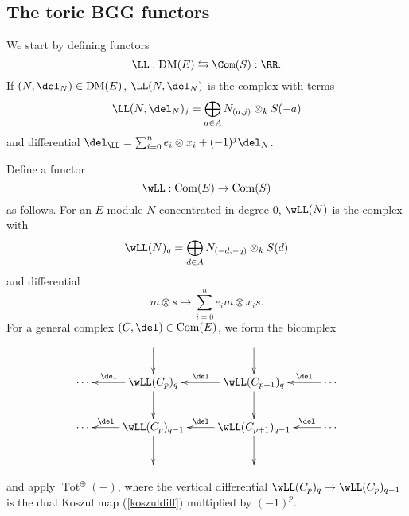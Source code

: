 \documentclass[12pt]{amsart}
\theoremstyle{definition}
\theoremstyle{remark}
\newcommand{\ZZ}{\mathbb Z}
\newcommand{\daniel}[1]{{\color{blue} \sf $\clubsuit\clubsuit\clubsuit$ Daniel: [#1]}}
\def\on{\operatorname}
\def\DM{\operatorname{DM}}
\begin{document}
\subsection{The toric BGG functors}
\iffalse
In the BGG correspondence for the standard $\ZZ$-graded polynomial ring, there are adjoint functors $\RR$ and $\LL$, which give equivalences of categories between $D(S)$ and $D(E)$.  

Famously, under the functor $\RR$,  the standard $\ZZ$-grading of the $S$-modules becomes the homological grading on $D(E)$ side, and the homological grading on $D(S)$ becomes the $\ZZ$-grading of the $E$-modules.  (A similar statement holds for $\LL$.)

Things are more subtle if $S$ has a nonstandard grading, though a similar exchange still holds.  In this section, we will define adjoint functors $\RR$ and $\LL$ which give equivalences of categories between the derived category of $S$-modules and the derived category of differen \daniel{got interrupted while editing\dots}
\fi
We start by defining functors
$$
\LL : \DM(E) \leftrightarrows \Com(S) : \RR.
$$
If $(N, \del_N) \in \DM(E)$, $\LL(N, \del_N)$ is the complex with terms
$$
\LL(N, \del_N)_j = \bigoplus_{a \in A} N_{(a, j)} \otimes_k S(-a)
$$
and differential $\del_{\LL} = \sum_{i = 0}^n e_i \otimes x_i + (-1)^j \del_N$. 


\iffalse
Define a functor
$$
\wLL : \on{Com}(E) \to \on{Com}(S)
$$
as follows. For an $E$-module $N$ concentrated in degree 0, $\wLL(N)$ is the complex with
$$
\wLL(N)_q = \bigoplus_{d \in A} N_{(-d, -q)} \otimes_k S(d)
$$ 
and differential
\begin{equation}
\label{koszuldiff}
m \otimes s \mapsto \sum_{i = 0}^n e_im \otimes x_is.
\end{equation}
For a general complex $(C, \del) \in \on{Com}(E)$, we form the bicomplex
\begin{equation}
\label{bicomplex}
\xymatrix{ 
& \ar[d] & \ar[d]  & \\
\cdots & \wLL(C_{p})_{q}\ar[l]_-{ \del}  \ar[d]     & \wLL(C_{p + 1})_q   \ar[d] \ar[l]_-{ \del} & \cdots \ar[l]_-{\del} \\
\cdots & \wLL(C_{p })_{q- 1} \ar[d] \ar[l]_-{\del} &  \wLL(C_{p+1})_{q-1} \ar[d] \ar[l]_-{\del} & \ar[l]_-{\del}  \cdots \\
&&&
}
\end{equation}
and apply $\on{Tot}^{\oplus}( - )$, where the vertical differential $ \wLL(C_{p})_{q} \to  \wLL(C_{p})_{q-1}$ is the dual Koszul map (\ref{koszuldiff}) multiplied by $(-1)^p$. 
\end{document}
